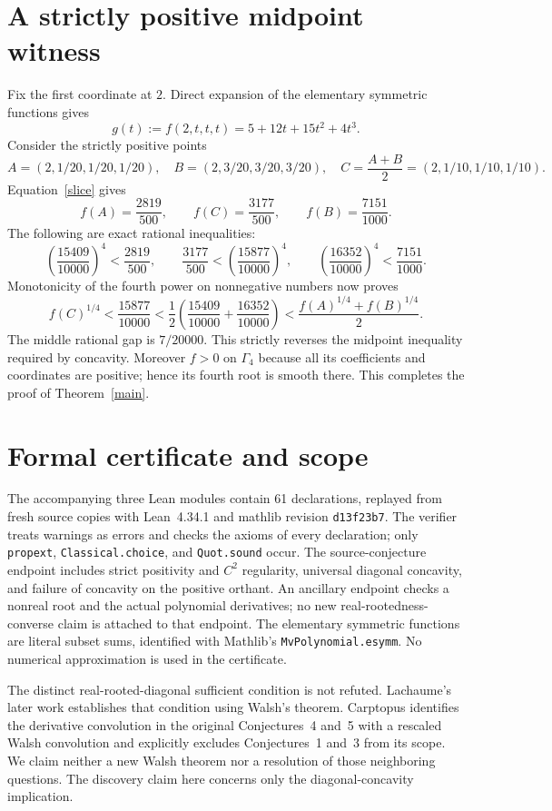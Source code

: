 \documentclass[11pt]{article}
\begin{document}
\section{A strictly positive midpoint witness}
Fix the first coordinate at $2$. Direct expansion of the elementary
symmetric functions gives
\begin{equation}\label{slice}
 g(t):=f(2,t,t,t)=5+12t+15t^2+4t^3.
\end{equation}
Consider the strictly positive points
\[
 A=(2,1/20,1/20,1/20),\quad
 B=(2,3/20,3/20,3/20),\quad
 C=\frac{A+B}{2}=(2,1/10,1/10,1/10).
\]
Equation~\eqref{slice} gives
\[
 f(A)=\frac{2819}{500},\qquad
 f(C)=\frac{3177}{500},\qquad
 f(B)=\frac{7151}{1000}.
\]
The following are exact rational inequalities:
\[
 \left(\frac{15409}{10000}\right)^4<\frac{2819}{500},\qquad
 \frac{3177}{500}<\left(\frac{15877}{10000}\right)^4,\qquad
 \left(\frac{16352}{10000}\right)^4<\frac{7151}{1000}.
\]
Monotonicity of the fourth power on nonnegative numbers now proves
\[
 f(C)^{1/4}<\frac{15877}{10000}
 <\frac12\left(\frac{15409}{10000}+\frac{16352}{10000}\right)
 <\frac{f(A)^{1/4}+f(B)^{1/4}}2.
\]
The middle rational gap is $7/20000$. This strictly reverses the midpoint
inequality required by concavity. Moreover $f>0$ on $\Gamma_4$ because
all its coefficients and coordinates are positive; hence its fourth
root is smooth there. This completes the proof of Theorem~\ref{main}.

\section{Formal certificate and scope}
The accompanying three Lean modules contain 61 declarations, replayed
from fresh source copies with Lean~4.34.1 and mathlib revision
\texttt{d13f23b7}. The verifier treats warnings as errors and checks the
axioms of every declaration; only
\texttt{propext}, \texttt{Classical.choice}, and \texttt{Quot.sound} occur.
The source-conjecture endpoint includes strict positivity and $C^2$
regularity, universal diagonal concavity, and failure of concavity
on the positive orthant. An ancillary endpoint checks a nonreal root
and the actual polynomial derivatives; no new real-rootedness-converse
claim is attached to that endpoint. The elementary symmetric functions are literal
subset sums, identified with Mathlib's \texttt{MvPolynomial.esymm}.
No numerical approximation is used in the certificate.

The distinct real-rooted-diagonal sufficient condition is not refuted.
Lachaume's later work \cite[Theorem~2.7(d)]{L18} establishes that condition
using Walsh's theorem. Carptopus \cite{CW} identifies the derivative
convolution in the original Conjectures~4 and~5 with a rescaled Walsh
convolution and explicitly excludes Conjectures~1 and~3 from its scope.
We claim neither a new Walsh theorem nor a resolution of those neighboring
questions. The discovery claim here concerns only the diagonal-concavity implication.
\end{document}
